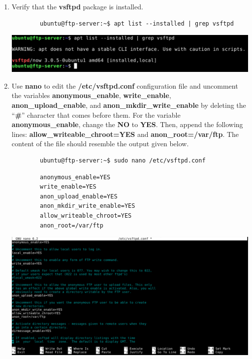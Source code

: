 \documentclass[letterpaper, 12pt]{article}
\begin{document}
\begin{enumerate}
    \item Verify that the \textbf{vsftpd} package is installed.
    \begin{lstlisting}
        ubuntu@ftp-server:~$ apt list --installed | grep vsftpd
    \end{lstlisting}

    \begin{center}
        \includegraphics[width=\linewidth]{images/part2/step9.png}
    \end{center}

    \item Use \textbf{nano} to edit the \textbf{/etc/vsftpd.conf} configuration file and uncomment the variables
    \textbf{anonymous\_enable}, \textbf{write\_enable}, \textbf{anon\_upload\_enable}, and
    \textbf{anon\_mkdir\_write\_enable} by deleting the ``\textbf{\#}'' character that comes before them. For
    the variable \textbf{anonymous\_enable}, change the \textbf{NO} to \textbf{YES}. Then, append the following lines:
    \textbf{allow\_writeable\_chroot=YES} and \textbf{anon\_root=/var/ftp}. The content of the file should resemble the
    output given below.
    \begin{lstlisting}
        ubuntu@ftp-server:~$ sudo nano /etc/vsftpd.conf
    \end{lstlisting}
    \begin{lstlisting}
        anonymous_enable=YES
        write_enable=YES
        anon_upload_enable=YES
        anon_mkdir_write_enable=YES
        allow_writeable_chroot=YES
        anon_root=/var/ftp
    \end{lstlisting}

    \begin{center}
        \includegraphics[width=\linewidth]{images/part2/step10.png}
    \end{center}


\end{enumerate}
\end{document}
